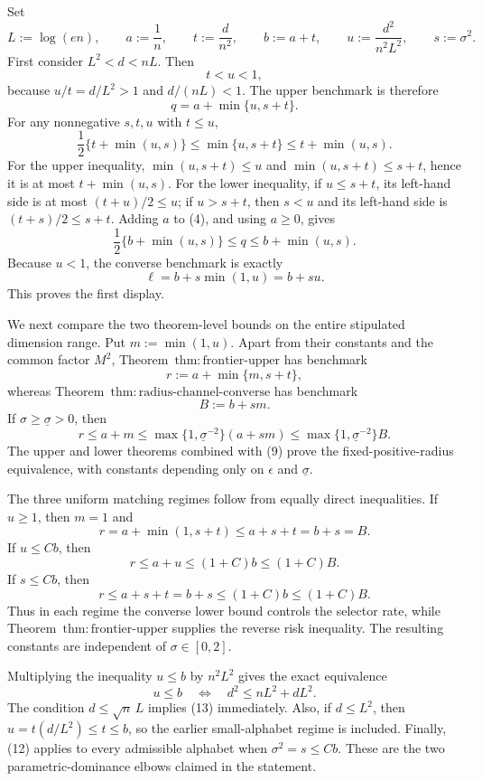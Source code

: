 Set
\[
 L:=\log(en),\qquad a:=\frac1n,\qquad t:=\frac d{n^2},
 \qquad b:=a+t,\qquad u:=\frac{d^2}{n^2L^2},
 \qquad s:=\sigma^2.
\tag{1}
\]
First consider \(L^2<d<nL\).  Then
\[
 t<u<1,
\tag{2}
\]
because \(u/t=d/L^2>1\) and \(d/(nL)<1\).  The upper benchmark is therefore
\[
 q=a+\min\{u,s+t\}.
\tag{3}
\]
For any nonnegative \(s,t,u\) with \(t\le u\),
\[
 \frac12\{t+\min(u,s)\}
 \le \min\{u,s+t\}
 \le t+\min(u,s).
\tag{4}
\]
For the upper inequality, \(\min(u,s+t)\le u\) and \(\min(u,s+t)\le s+t\), hence it is at most \(t+\min(u,s)\).  For the lower inequality, if \(u\le s+t\), its left-hand side is at most \((t+u)/2\le u\); if \(u>s+t\), then \(s<u\) and its left-hand side is \((t+s)/2\le s+t\).  Adding \(a\) to (4), and using \(a\ge0\), gives
\[
 \frac12\{b+\min(u,s)\}
 \le q\le b+\min(u,s).
\tag{5}
\]
Because \(u<1\), the converse benchmark is exactly
\[
 \ell=b+s\min(1,u)=b+su.
\tag{6}
\]
This proves the first display.

We next compare the two theorem-level bounds on the entire stipulated dimension range.  Put \(m:=\min(1,u)\).  Apart from their constants and the common factor \(M^2\), Theorem~\(\mathrm{thm:frontier\text{-}upper}\) has benchmark
\[
 r:=a+\min\{m,s+t\},
\tag{7}
\]
whereas Theorem~\(\mathrm{thm:radius\text{-}channel\text{-}converse}\) has benchmark
\[
 B:=b+sm.
\tag{8}
\]
If \(\sigma\ge\underline\sigma>0\), then
\[
 r\le a+m
 \le \max\{1,\underline\sigma^{-2}\}(a+sm)
 \le \max\{1,\underline\sigma^{-2}\}B.
\tag{9}
\]
The upper and lower theorems combined with (9) prove the fixed-positive-radius equivalence, with constants depending only on \(\epsilon\) and \(\underline\sigma\).

The three uniform matching regimes follow from equally direct inequalities.  If \(u\ge1\), then \(m=1\) and
\[
 r=a+\min(1,s+t)\le a+s+t=b+s=B.
\tag{10}
\]
If \(u\le Cb\), then
\[
 r\le a+u\le(1+C)b\le(1+C)B.
\tag{11}
\]
If \(s\le Cb\), then
\[
 r\le a+s+t=b+s\le(1+C)b\le(1+C)B.
\tag{12}
\]
Thus in each regime the converse lower bound controls the selector rate, while Theorem~\(\mathrm{thm:frontier\text{-}upper}\) supplies the reverse risk inequality.  The resulting constants are independent of \(\sigma\in[0,2]\).

Multiplying the inequality \(u\le b\) by \(n^2L^2\) gives the exact equivalence
\[
 u\le b
 \quad\Longleftrightarrow\quad
 d^2\le nL^2+dL^2.
\tag{13}
\]
The condition \(d\le\sqrt n\,L\) implies (13) immediately.  Also, if \(d\le L^2\), then \(u=t(d/L^2)\le t\le b\), so the earlier small-alphabet regime is included.  Finally, (12) applies to every admissible alphabet when \(\sigma^2=s\le Cb\).  These are the two parametric-dominance elbows claimed in the statement.

